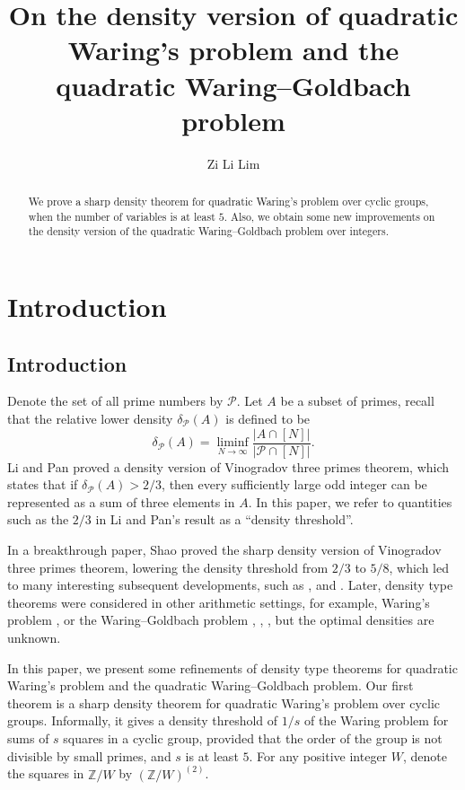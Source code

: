 \documentclass[11pt]{amsart}
\title[The density version of Waring's problem and the Waring--Goldbach problem]{On the density version of quadratic Waring's problem and the quadratic Waring--Goldbach problem}
\author{Zi Li Lim}
\theoremstyle{plain} %
\theoremstyle{remark}
\numberwithin{equation}{section}
\newcommand{\Z}{\mathbb{Z}}
\begin{document}
\maketitle

\begin{abstract}
We prove a sharp density theorem for quadratic Waring's problem over cyclic groups, when the number of variables is at least $5$. Also, we obtain some new improvements on the density version of the quadratic Waring--Goldbach problem over integers.
\end{abstract}

\section{Introduction}\label{sec: intro}

\subsection{Introduction}

Denote the set of all prime numbers by $\mathcal{P}$. Let $A$ be a subset of primes, recall that the relative lower density $\delta_{\mathcal{P}}(A)$ is defined to be
\begin{equation*}
    \delta_{\mathcal{P}}(A)=\liminf_{N\rightarrow\infty}\frac{|A\cap[N]|}{|\mathcal{P}\cap[N]|}.
\end{equation*}
Li and Pan \cite{LiPan} proved a density version of Vinogradov three primes theorem, which states that if $\delta_{\mathcal{P}}(A)>2/3$, then every sufficiently large odd integer can be represented as a sum of three elements in $A$. In this paper, we refer to quantities such as the $2/3$ in Li and Pan's result as a ``density threshold''.

In a breakthrough paper, Shao \cite{Shao} proved the sharp density version of Vinogradov three primes theorem, lowering the density threshold from $2/3$ to $5/8$, which led to many interesting subsequent developments, such as \cite{ShaoLFunction}, \cite{MatomakiShao} and \cite{MatomakiMaynardShao}. Later, density type theorems were considered in other arithmetic settings, for example, Waring's problem \cite{Salmensuu}, or the Waring--Goldbach problem \cite{Gao}, \cite{zhao2025densitytheoremprimesquares}, \cite{Tan}, but the optimal densities are unknown.

In this paper, we present some refinements of density type theorems for quadratic Waring's problem and the quadratic Waring--Goldbach problem. Our first theorem is a sharp density theorem for quadratic Waring's problem over cyclic groups. Informally, it gives a density threshold of $1/s$ of the Waring problem for sums of $s$ squares in a cyclic group, provided that the order of the group is not divisible by small primes, and $s$ is at least $5$. For any positive integer $W$, denote the squares in $\Z/W$ by $(\Z/W)^{(2)}$. 
\end{document}
